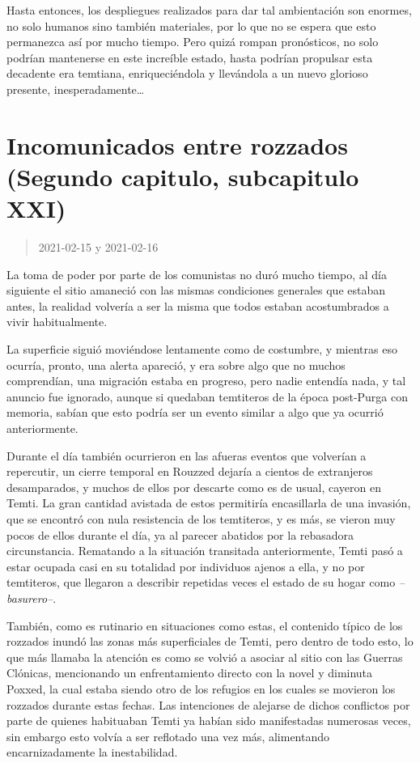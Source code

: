 \documentclass[
  spanish,
]{book}
\begin{document}
Hasta entonces, los despliegues realizados para dar tal ambientación son enormes, no solo humanos sino también materiales, por lo que no se espera que esto permanezca así por mucho tiempo. Pero quizá rompan pronósticos, no solo podrían mantenerse en este increíble estado, hasta podrían propulsar esta decadente era temtiana, enriqueciéndola y llevándola a un nuevo glorioso presente, inesperadamente\ldots{}

\hypertarget{incomunicados-entre-rozzados-segundo-capitulo-subcapitulo-xxi}{%
\section{Incomunicados entre rozzados (Segundo capitulo, subcapitulo XXI)}\label{incomunicados-entre-rozzados-segundo-capitulo-subcapitulo-xxi}}

\begin{quote}
2021-02-15 y 2021-02-16
\end{quote}

La toma de poder por parte de los comunistas no duró mucho tiempo, al día siguiente el sitio amaneció con las mismas condiciones generales que estaban antes, la realidad volvería a ser la misma que todos estaban acostumbrados a vivir habitualmente.

La superficie siguió moviéndose lentamente como de costumbre, y mientras eso ocurría, pronto, una alerta apareció, y era sobre algo que no muchos comprendían, una migración estaba en progreso, pero nadie entendía nada, y tal anuncio fue ignorado, aunque si quedaban temtiteros de la época post-Purga con memoria, sabían que esto podría ser un evento similar a algo que ya ocurrió anteriormente.

Durante el día también ocurrieron en las afueras eventos que volverían a repercutir, un cierre temporal en Rouzzed dejaría a cientos de extranjeros desamparados, y muchos de ellos por descarte como es de usual, cayeron en Temti. La gran cantidad avistada de estos permitiría encasillarla de una invasión, que se encontró con nula resistencia de los temtiteros, y es más, se vieron muy pocos de ellos durante el día, ya al parecer abatidos por la rebasadora circunstancia. Rematando a la situación transitada anteriormente, Temti pasó a estar ocupada casi en su totalidad por individuos ajenos a ella, y no por temtiteros, que llegaron a describir repetidas veces el estado de su hogar como \emph{--basurero--}.

También, como es rutinario en situaciones como estas, el contenido típico de los rozzados inundó las zonas más superficiales de Temti, pero dentro de todo esto, lo que más llamaba la atención es como se volvió a asociar al sitio con las Guerras Clónicas, mencionando un enfrentamiento directo con la novel y diminuta Poxxed, la cual estaba siendo otro de los refugios en los cuales se movieron los rozzados durante estas fechas. Las intenciones de alejarse de dichos conflictos por parte de quienes habituaban Temti ya habían sido manifestadas numerosas veces, sin embargo esto volvía a ser reflotado una vez más, alimentando encarnizadamente la inestabilidad.
\end{document}
